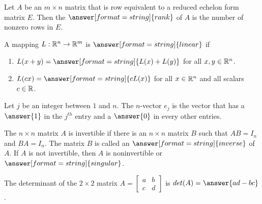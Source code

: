 \documentclass[nooutcomes]{ximera}
\begin{document}
\begin{question}
Let $A$ be an $m \times n$ matrix that is row equivalent to a reduced echelon form matrix $E$. Then 
the $\answer[format=string]{rank}$ of $A$ %
is the number of nonzero rows in $E$. 
\end{question} 

\begin{question}
A mapping $L: \mathbb R^n \to \mathbb R^m$ is $\answer[format=string]{linear}$ if 
\begin{enumerate}
\item $L(x+y)=\answer[format=string]{L(x)+L(y)}$ for all $x,y\in \mathbb R^n$. 
\item $L(cx)=\answer[format=string]{cL(x)}$ for all $x\in \mathbb R^n$ and all scalars $c\in \mathbb R$.
\end{enumerate}
\end{question} 

\begin{question}
Let $j$ be an integer between $1$ and $n$. The $n$-vector $e_j$ is the vector that has a $\answer{1}$ in the $j^{th}$ entry and a $\answer{0}$ in every other entries. 
\end{question} 

\begin{question}
The $n \times n$ matrix $A$ is invertible if there is an $n \times n$ matrix $B$ such that 
$AB=I_n$ and $BA=I_n$. 
The matrix $B$ is called an $\answer[format=string]{inverse}$ of $A$. If $A$ is not invertible, then $A$ is noninvertible or $\answer[format=string]{singular}$. 
\end{question} 

\begin{question}
The determinant of the $2 \times 2$ matrix $A = \begin{bmatrix} a & b \\ c & d\end{bmatrix}$ is $det(A) = \answer{ad - bc}$. 
\end{question} 

%
%
%
%
%
\end{document}
